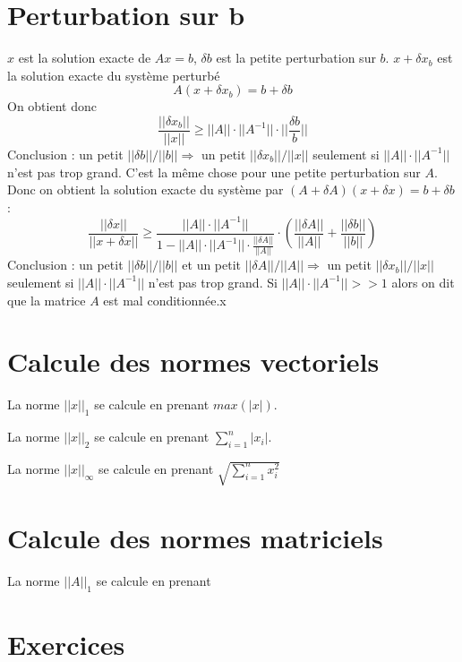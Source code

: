 \documentclass[11pt,a4paper]{report}
\newcommand{\vecnorm}[1]{||#1||}
\newcommand{\normun}[1]{||#1||_1}
\newcommand{\normdeux}[1]{||#1||_2}
\newcommand{\norminf}[1]{||#1||_{\infty}}
\begin{document}
\section{Perturbation sur b}

$x$ est la solution exacte de $Ax=b$, $\delta b$ est la petite perturbation sur $b$. $x + \delta x_b$ est la solution exacte du système perturbé
$$
A(x+\delta x_b) = b + \delta b
$$
On obtient donc
$$
\frac{\vecnorm{\delta x_b}}{\vecnorm{x}} \geq \vecnorm{A}\cdot \vecnorm{A^{-1}}\cdot\vecnorm{\frac{\delta b}{b}}
$$
Conclusion : un petit $\vecnorm{\delta b} / \vecnorm{b} \Rightarrow$ un petit $\vecnorm{\delta x_b}/\vecnorm{x}$ seulement si $\vecnorm{A}\cdot \vecnorm{A^{-1}}$ n'est pas trop grand. C'est la même chose pour une petite perturbation sur $A$. Donc on obtient la solution exacte du système par $(A + \delta A)(x + \delta x) = b + \delta b$ :
$$
\frac{\vecnorm{\delta x}}{\vecnorm{x + \delta x}} \geq \frac{\vecnorm{A}\cdot\vecnorm{A^{-1}}}{1-\vecnorm{A}\cdot\vecnorm{A^{-1}}\cdot\frac{\vecnorm{\delta A}}{\vecnorm{A}}} \cdot (\frac{\vecnorm{\delta A}}{\vecnorm{A}} + \frac{\vecnorm{\delta b}}{\vecnorm{b}})
$$
Conclusion : un petit $\vecnorm{\delta b} / \vecnorm{b}$ et un petit $\vecnorm{\delta A} / \vecnorm{A} \Rightarrow$ un petit $\vecnorm{\delta x_b}/\vecnorm{x}$ seulement si $\vecnorm{A}\cdot \vecnorm{A^{-1}}$ n'est pas trop grand. Si $\vecnorm{A}\cdot \vecnorm{A^{-1}} >> 1$ alors on dit que la matrice $A$ est mal conditionnée.x

\section{Calcule des normes vectoriels}

La norme $\normun{x}$ se calcule en prenant $max(|x|)$.

La norme $\normdeux{x}$ se calcule en prenant $\sum_{i=1}^n |x_i|$.

La norme $\norminf{x}$ se calcule en prenant $\sqrt{\sum_{i=1}^n x_i^2}$

\section{Calcule des normes matriciels}



La norme $\normun{A}$ se calcule en prenant 

\section{Exercices}
\end{document}
